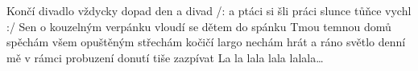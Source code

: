 \begin{TEXT}{Končí divadlo}
\SLOKA {} vždycky  dopad \NL
{} den a  divad \NL
/:  a  ptáci \NL
{} si šli  práci \NL
{}slunce tůňce vychl :/
\SLOKA Sen o kouzelným verpánku \NL
vloudí se dětem do spánku \NL
Tmou temnou domů spěchám \NL
všem opuštěným střechám \NL
kočičí largo nechám hrát \NL
a ráno světlo denní \NL
mě v rámci probuzení \NL
donutí tiše zazpívat 
\SLOKA La la lala lala lalala… \NL
\end{TEXT}
